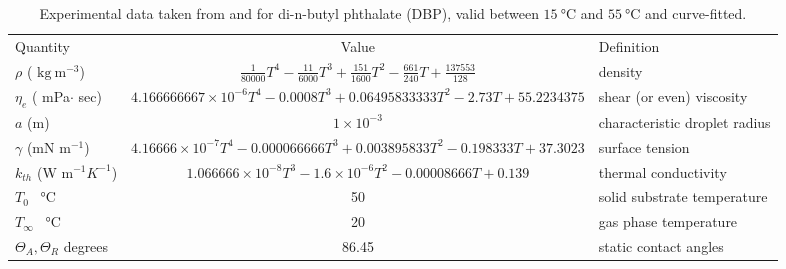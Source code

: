 \documentclass[%
 amsmath,amssymb,
 aps,
10.5pt]{revtex4-2}
\begin{document}
\begin{table*}[t]%
\caption{\label{tab:table1}%
Experimental data taken from \cite{Blake2019} and \cite{Haynes2016} for di-n-butyl phthalate (DBP), valid
between $\SI{15}{\celsius}$ and $\SI{55}{\celsius}$ and curve-fitted.}
\begin{ruledtabular}
\begin{tabular}{lcl}
\textrm{Quantity}&
\textrm{Value}&
\textrm{Definition}\\
\colrule
$\rho$ ( $\textrm{kg}\:\textrm{m}^{-3} $)    & $\frac{1}{80000} T^{4}-\frac{11}{6000} T^{3}+\frac{151}{1600} T^{2}-\frac{661}{240} T +\frac{137553}{128}$        & density \\
$\eta_e$ ( mPa$\cdot$ sec)    & $4.166666667\times 10^{-6} T^{4}- 0.0008T^{3}+ 0.06495833333 T^{2}- 2.73T + 55.2234375$        & shear (or even) viscosity \\
$a$ (m)  & $1\times10^{-3}$& characteristic droplet radius\\
$\gamma$ (mN $\textrm{m}^{-1}$) &$4.16666\times 10^{-7} T^{4}- 0.000066666 T^{3}+ 0.003895833 T^{2}- 0.198333 T + 37.3023$& surface tension \\
$k_{th}$ (W $\textrm{m}^{-1}K^{-1}$) &$1.066666\times 10^{-8} T^{3}- 1.6\times 10^{-6} T^{2}- 0.00008666T + 0.139$& thermal conductivity  \\
$T_0$  \SI{}{\celsius} &50 & solid substrate temperature\\
$T_\infty$  \SI{}{\celsius} &20 & gas phase temperature\\
$\Theta_A, \Theta_R$ degrees& 86.45&  static contact angles
\end{tabular}
\end{ruledtabular}
\end{table*}
\end{document}
